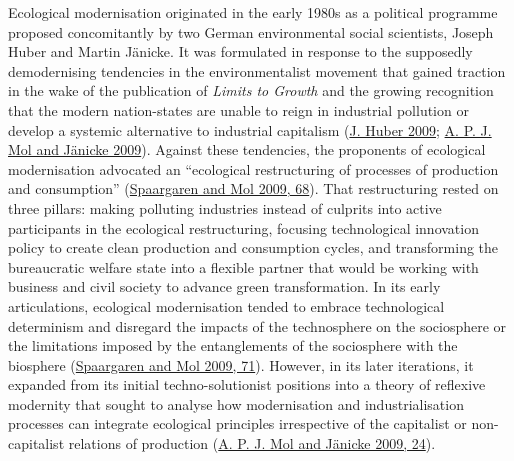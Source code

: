 \documentclass[a4paper, nobind]{templates/ociamthesis}
\begin{document}
Ecological modernisation originated in the early 1980s as a political programme proposed concomitantly by two German environmental social scientists, Joseph Huber and Martin Jänicke. It was formulated in response to the supposedly demodernising tendencies in the environmentalist movement that gained traction in the wake of the publication of \emph{Limits to Growth} and the growing recognition that the modern nation-states are unable to reign in industrial pollution or develop a systemic alternative to industrial capitalism (\protect\hyperlink{ref-huber_ecological_2009}{J. Huber 2009}; \protect\hyperlink{ref-mol_origins_2009}{A. P. J. Mol and Jänicke 2009}). Against these tendencies, the proponents of ecological modernisation advocated an ``ecological restructuring of processes of production and consumption'' (\protect\hyperlink{ref-spaargaren_sociology_2009}{Spaargaren and Mol 2009, 68}). That restructuring rested on three pillars: making polluting industries instead of culprits into active participants in the ecological restructuring, focusing technological innovation policy to create clean production and consumption cycles, and transforming the bureaucratic welfare state into a flexible partner that would be working with business and civil society to advance green transformation. In its early articulations, ecological modernisation tended to embrace technological determinism and disregard the impacts of the technosphere on the sociosphere or the limitations imposed by the entanglements of the sociosphere with the biosphere (\protect\hyperlink{ref-spaargaren_sociology_2009}{Spaargaren and Mol 2009, 71}). However, in its later iterations, it expanded from its initial techno-solutionist positions into a theory of reflexive modernity that sought to analyse how modernisation and industrialisation processes can integrate ecological principles irrespective of the capitalist or non-capitalist relations of production (\protect\hyperlink{ref-mol_origins_2009}{A. P. J. Mol and Jänicke 2009, 24}).
\end{document}
